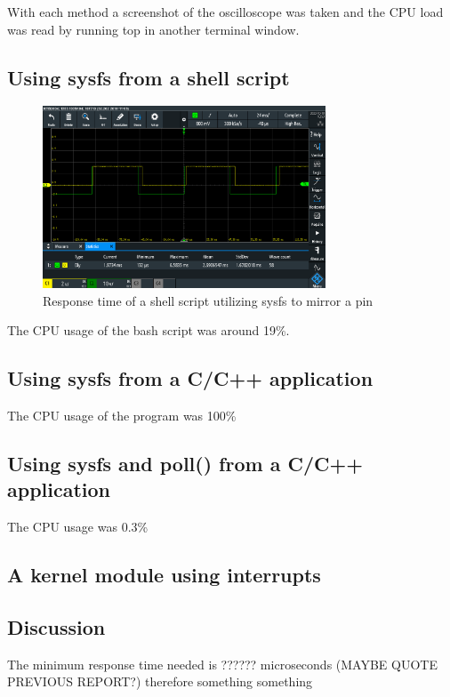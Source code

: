 \documentclass{article}
\begin{document}
With each method a screenshot of the oscilloscope was taken and the CPU load was read by running top in another terminal window.

\subsection{Using sysfs from a shell script}

\begin{figure}[h]
    \centering
    \includegraphics[width=0.75\textwidth]{Project4KernelSpaceEncoderDriver/part2_shell_mirror.PNG}
    \caption{Response time of a shell script utilizing sysfs to mirror a pin}
    \label{fig:shell}
\end{figure}
The CPU usage of the bash script was around 19\%.

\subsection{Using sysfs from a C/C++ application}

The CPU usage of the program was 100\%

\subsection{Using sysfs and poll() from a C/C++ application}

The CPU usage was 0.3\%

\subsection{A kernel module using interrupts}





\subsection{Discussion}
The minimum response time needed is ?????? microseconds (MAYBE QUOTE PREVIOUS REPORT?) therefore something something
\end{document}
